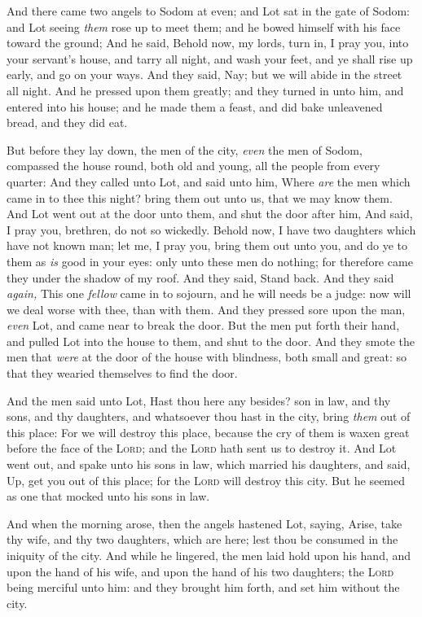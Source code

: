 \documentclass[11pt,letterpaper,oneside]{memoir}
\begin{document}
And there came two angels to Sodom at even; and Lot sat in the gate of
Sodom: and Lot seeing \emph{them} rose up to meet them; and he bowed
himself with his face toward the ground; And he said, Behold now, my
lords, turn in, I pray you, into your servant's house, and tarry all
night, and wash your feet, and ye shall rise up early, and go on your
ways. And they said, Nay; but we will abide in the street all night. And
he pressed upon them greatly; and they turned in unto him, and entered
into his house; and he made them a feast, and did bake unleavened bread,
and they did eat.

But before they lay down, the men of the city, \emph{even} the men of
Sodom, compassed the house round, both old and young, all the people
from every quarter: And they called unto Lot, and said unto him, Where
\emph{are} the men which came in to thee this night? bring them out unto
us, that we may know them. And Lot went out at the door unto them, and
shut the door after him, And said, I pray you, brethren, do not so
wickedly. Behold now, I have two daughters which have not known man; let
me, I pray you, bring them out unto you, and do ye to them as \emph{is}
good in your eyes: only unto these men do nothing; for therefore came
they under the shadow of my roof. And they said, Stand back. And they
said \emph{again,} This one \emph{fellow} came in to sojourn, and he
will needs be a judge: now will we deal worse with thee, than with them.
And they pressed sore upon the man, \emph{even} Lot, and came near to
break the door. But the men put forth their hand, and pulled Lot into
the house to them, and shut to the door. And they smote the men that
\emph{were} at the door of the house with blindness, both small and
great: so that they wearied themselves to find the door.

And the men said unto Lot, Hast thou here any besides? son in law, and
thy sons, and thy daughters, and whatsoever thou hast in the city, bring
\emph{them} out of this place: For we will destroy this place, because
the cry of them is waxen great before the face of the \textsc{Lord}; and
the \textsc{Lord} hath sent us to destroy it. And Lot went out, and spake
unto his sons in law, which married his daughters, and said, Up, get you
out of this place; for the \textsc{Lord} will destroy this city. But he
seemed as one that mocked unto his sons in law.

And when the morning arose, then the angels hastened Lot, saying, Arise,
take thy wife, and thy two daughters, which are here; lest thou be
consumed in the iniquity of the city. And while he lingered, the men
laid hold upon his hand, and upon the hand of his wife, and upon the
hand of his two daughters; the \textsc{Lord} being merciful unto him: and
they brought him forth, and set him without the city.
\end{document}

